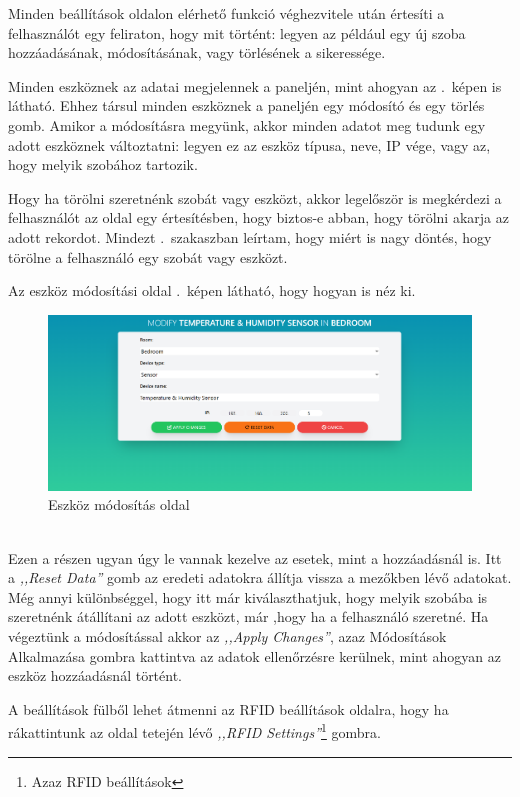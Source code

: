\documentclass[
]{thesis-ekf}
\theoremstyle{definition}
\theoremstyle{remark}
\begin{document}
	Minden beállítások oldalon elérhető funkció véghezvitele után értesíti a felhasználót egy feliraton, hogy mit történt: legyen az például egy új szoba hozzáadásának, módosításának, vagy törlésének a sikeressége.
	
	Minden eszköznek az adatai megjelennek a paneljén, mint ahogyan az .~képen is látható. Ehhez társul minden eszköznek a paneljén egy módosító és egy törlés gomb. Amikor a módosításra megyünk, akkor minden adatot meg tudunk egy adott eszköznek változtatni: legyen ez az eszköz típusa, neve, IP vége, vagy az, hogy melyik szobához tartozik.
	
	Hogy ha törölni szeretnénk szobát vagy eszközt, akkor legelőször is megkérdezi a felhasználót az oldal egy értesítésben, hogy biztos-e abban, hogy törölni akarja az adott rekordot. Mindezt .~szakaszban leírtam, hogy miért is nagy döntés, hogy törölne a felhasználó egy szobát vagy eszközt.
	
	Az eszköz módosítási oldal .~képen látható, hogy hogyan is néz ki.
	\begin{figure}[ht!]
		\centering
		\includegraphics[width=1\textwidth]{./src/pages_img/modify-sensor-in-bedroom}
		\caption{Eszköz módosítás oldal}
		\label{modify}
	\end{figure}\\
	Ezen a részen ugyan úgy le vannak kezelve az esetek, mint a hozzáadásnál is. Itt a \emph{,,Reset Data''} gomb az eredeti adatokra állítja vissza a mezőkben lévő adatokat. Még annyi különbséggel, hogy itt már kiválaszthatjuk, hogy melyik szobába is szeretnénk átállítani az adott eszközt, már ,hogy ha a felhasználó szeretné. Ha végeztünk a módosítással akkor az \emph{,,Apply Changes''}, azaz Módosítások Alkalmazása gombra kattintva az adatok ellenőrzésre kerülnek, mint ahogyan az eszköz hozzáadásnál történt.
	
	A beállítások fülből lehet átmenni az RFID beállítások oldalra, hogy ha rákattintunk az oldal tetején lévő \emph{,,RFID Settings''}\footnote{Azaz RFID beállítások} gombra.
	
\end{document}
